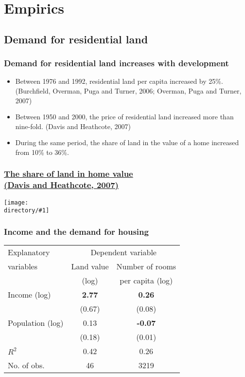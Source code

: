 \documentclass[handout,compress,mathserif]{beamer}
\newcommand{\directory}{figures}
\newcommand{\widefigure}[2]{\begin{frame}\frametitle{\hyperlink{#1back}{#2}}\hypertarget{#1}{{\begin{center}\texttt{[image: \\directory/\#1]}\end{center}}}\end{frame}}
\begin{document}
\section{Empirics}

\subsection{Demand for residential land}

\begin{frame}\frametitle{Demand for residential land increases with development}
\begin{itemize}
    \item Between 1976 and 1992, residential land per capita increased by 25\%.
    (Burchfield, Overman, Puga and Turner, 2006; Overman, Puga and Turner, 2007)
    \item Between 1950 and 2000,  the price of residential land increased more than nine-fold. (Davis and Heathcote, 2007)
    \item During the same period, the share of land in the value of a home increased from 10\% to 36\%.
\end{itemize}
\end{frame}

\widefigure{dh-shares}{The share of land in home value\\ (Davis and Heathcote, 2007)}


\begin{frame}\frametitle{Income and the demand for housing}
\begin{table}[h!]
\center 
\begin{tabular}{l|cc}
  \hline\hline
  Explanatory & \multicolumn{2}{c}{Dependent variable} \\
  variables & Land value & Number of rooms \\ 
            & (log)      & per capita (log) \\
  \hline
  Income (log)   & \textbf{2.77}   & \textbf{0.26}\\
                 & (0.67)          & (0.08)\\
  Population (log)    & 0.13            &  \textbf{-0.07}\\
                 & (0.18)          & (0.01) \\ \hline
  $R^2$          & 0.42            & 0.26\\
  No. of obs.    & 46              & 3219\\ \hline\hline
\end{tabular}
\end{table}
\end{frame}
\end{document}
